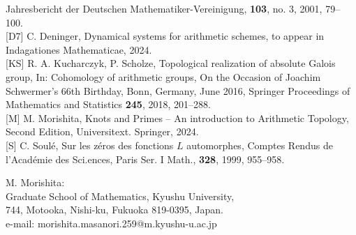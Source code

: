 \documentclass[12pt, leqno]{article}
\begin{document}
\begin{flushleft}
Jahresbericht der  Deutschen Mathematiker-Vereinigung, {\bf 103}, no. 3, 2001, 79--100.\\
{[D7]} C. Deninger, Dynamical systems for arithmetic schemes, to appear in Indagationes Mathematicae, 2024.\\
{[KS]} R. A. Kucharczyk, P. Scholze, Topological realization of absolute Galois group,  In: Cohomology of arithmetic groups, On the Occasion of Joachim Schwermer's 66th Birthday, Bonn, Germany, June 2016, Springer Proceedings of  Mathematics and  Statistics {\bf 245}, 2018, 201--288.\\
{[M]} M. Morishita, Knots and Primes -- An introduction to Arithmetic Topology, Second Edition,  Universitext. Springer, 2024. \\
{[S]} C.  Soul\'{e}, Sur les z\'{e}ros des fonctions $L$ automorphes, Comptes Rendus de l'Acad\'{e}mie des Sci.ences, Paris Ser. I Math.,  {\bf 328}, 1999, 955--958.
\end{flushleft}
\vspace{0.4cm}
{\small 
M. Morishita:\\
Graduate School of Mathematics, Kyushu University, \\
744, Motooka, Nishi-ku, Fukuoka  819-0395, Japan.\\
e-mail: morishita.masanori.259@m.kyushu-u.ac.jp \\
}
\end{document}
